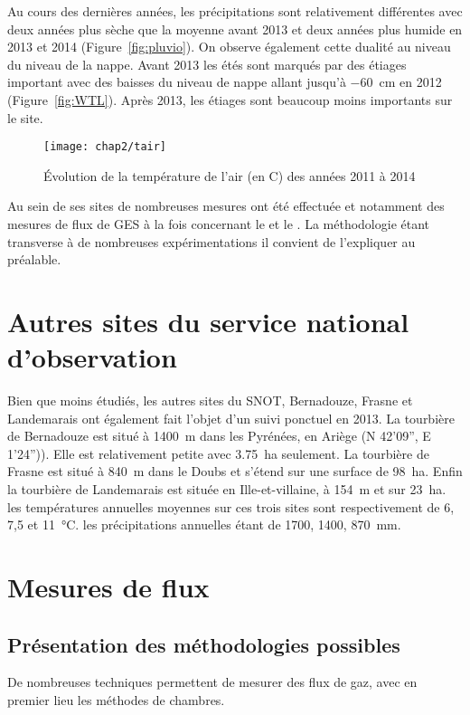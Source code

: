 Au cours des dernières années, les précipitations sont relativement différentes avec deux années plus sèche que la moyenne avant 2013 et deux années plus humide en 2013 et 2014 (Figure~\ref{fig:pluvio}).
On observe également cette dualité au niveau du niveau de la nappe.
Avant 2013 les étés sont marqués par des étiages important avec des baisses du niveau de nappe allant jusqu'à \SI{-60}{\cm} en 2012 (Figure~\ref{fig:WTL}).
Après 2013, les étiages sont beaucoup moins importants sur le site.



\begin{figure}
\centering
\texttt{[image: chap2/tair]}
\caption{Évolution de la température de l'air (en \textdegree C) des années 2011 à 2014}
\label{fig:tair}
\end{figure}



Au sein de ses sites de nombreuses mesures ont été effectuée et notamment des mesures de flux de GES à la fois concernant le \coo et le \chh. La méthodologie étant transverse à de nombreuses expérimentations il convient de l'expliquer au préalable.

\section{Autres sites du service national d'observation}

Bien que moins étudiés, les autres sites du SNOT, Bernadouze, Frasne et Landemarais ont également fait l'objet d'un suivi ponctuel en 2013.
La tourbière de Bernadouze est situé à \SI{1400}{\metre} dans les Pyrénées, en Ariège (N 42’09”, E 1’24”)).
Elle est relativement petite avec \SI{3.75}{\hectare} seulement.
La tourbière de Frasne est situé à \SI{840}{\metre} dans le Doubs et s'étend sur une surface de \SI{98}{\hectare}.
Enfin la tourbière de Landemarais est située en Ille-et-villaine, à \SI{154}{\metre} et sur \SI{23}{\hectare}.
les températures annuelles moyennes sur ces trois sites sont respectivement de 6, 7,5 et \SI{11}{\degreeCelsius}.
les précipitations annuelles étant de \num{1700}, \num{1400}, \SI{870}{\milli\meter}.


\section{Mesures de flux}
\label{sec:clsd_chbr_method}

\subsection{Présentation des méthodologies possibles}
De nombreuses techniques permettent de mesurer des flux de gaz, avec en premier lieu les méthodes de chambres.


